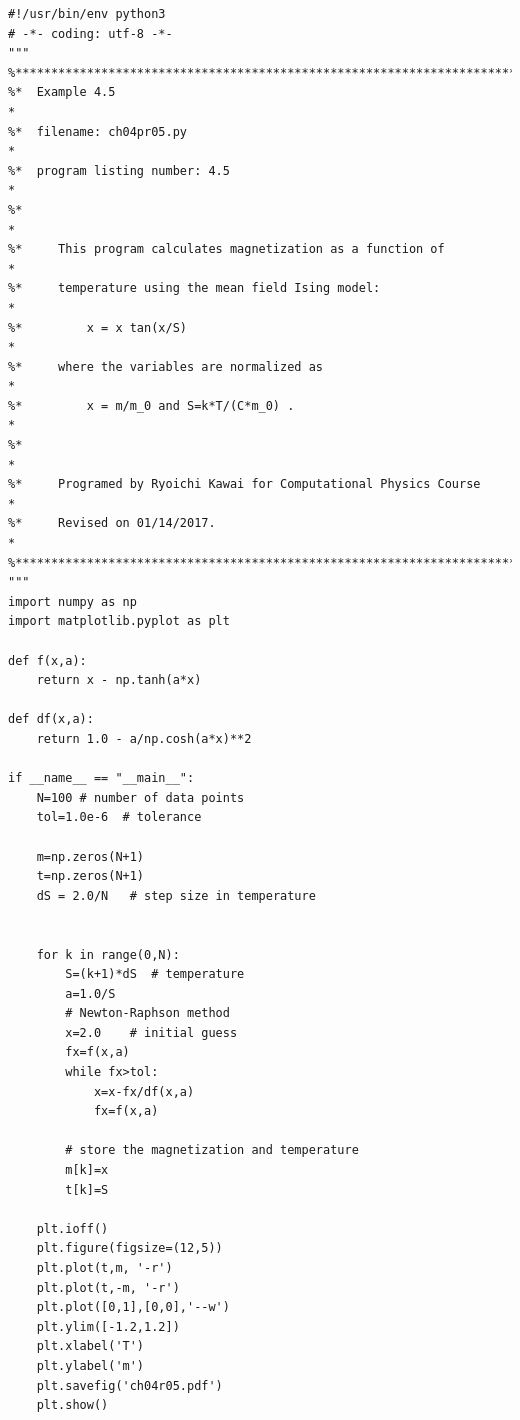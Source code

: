 
\bigskip\noindent
\program
\footnotesize
\begin{verbatim}
#!/usr/bin/env python3
# -*- coding: utf-8 -*-
"""
%**************************************************************************
%*  Example 4.5                                                           *
%*  filename: ch04pr05.py                                                 *
%*  program listing number: 4.5                                           *
%*                                                                        *
%*     This program calculates magnetization as a function of             *
%*     temperature using the mean field Ising model:                      *
%*         x = x tan(x/S)                                                 *
%*     where the variables are normalized as                              *
%*         x = m/m_0 and S=k*T/(C*m_0) .                                  *
%*                                                                        *
%*     Programed by Ryoichi Kawai for Computational Physics Course        *
%*     Revised on 01/14/2017.                                             *
%**************************************************************************
"""
import numpy as np
import matplotlib.pyplot as plt

def f(x,a):
    return x - np.tanh(a*x)

def df(x,a):
    return 1.0 - a/np.cosh(a*x)**2

if __name__ == "__main__": 
    N=100 # number of data points
    tol=1.0e-6  # tolerance

    m=np.zeros(N+1)
    t=np.zeros(N+1)
    dS = 2.0/N   # step size in temperature

    
    for k in range(0,N):
        S=(k+1)*dS  # temperature
        a=1.0/S
        # Newton-Raphson method
        x=2.0    # initial guess
        fx=f(x,a)
        while fx>tol:
            x=x-fx/df(x,a)
            fx=f(x,a)

        # store the magnetization and temperature  
        m[k]=x
        t[k]=S

    plt.ioff()
    plt.figure(figsize=(12,5))
    plt.plot(t,m, '-r')
    plt.plot(t,-m, '-r')
    plt.plot([0,1],[0,0],'--w')
    plt.ylim([-1.2,1.2])
    plt.xlabel('T')
    plt.ylabel('m')
    plt.savefig('ch04r05.pdf')
    plt.show()
\end{verbatim}
\normalsize


